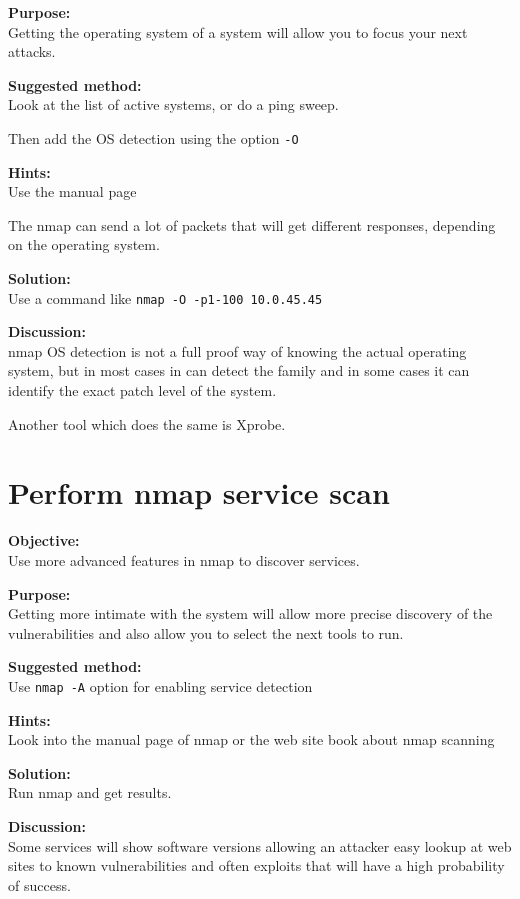 \documentclass[a4paper,11pt,notitlepage]{report}
\begin{document}
{\bf Purpose:}\\
Getting the operating system of a system will allow you to focus your next attacks.

{\bf Suggested method:}\\
Look at the list of active systems, or do a ping sweep.

Then add the OS detection using the option \verb+-O+

{\bf Hints:} \\
Use the manual page

The nmap can send a lot of packets that will get different responses, depending on the operating system.

{\bf Solution:}\\
Use a command like \verb+nmap -O -p1-100 10.0.45.45+


{\bf Discussion:}\\
nmap OS detection is not a full proof way of knowing the actual operating system, but in most cases in can detect the family and in some cases it can identify the exact patch level of the system.

Another tool which does the same is Xprobe.

\chapter{Perform nmap service scan}
\label{ex:nmap-service}

{\bf Objective:} \\
Use more advanced features in nmap to discover services.

{\bf Purpose:}\\
Getting more intimate with the system will allow more precise discovery of the vulnerabilities and also allow you to select the next tools to run.

{\bf Suggested method:}\\
Use \verb+nmap -A+ option for enabling service detection

{\bf Hints:} \\
Look into the manual page of nmap or the web site book about nmap scanning

{\bf Solution:}\\
Run nmap and get results.

{\bf Discussion:}\\

Some services will show software versions allowing an attacker easy lookup at web sites to known vulnerabilities and often exploits that will have a high probability of success.
\end{document}
